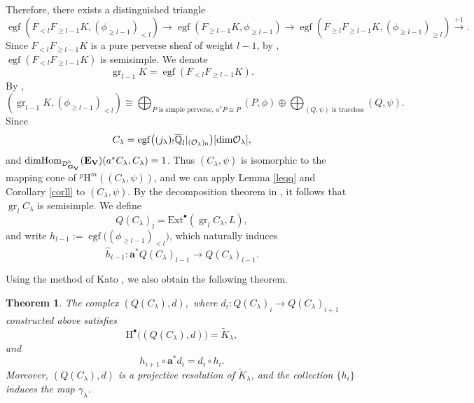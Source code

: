 \documentclass[10pt,a4paper]{amsart}
\newtheorem{theorem}{Theorem}[section]
\def\Hom{\mbox{\rm Hom}}  \def\ap{\mbox{\rm ap}}
\def\dim{\mbox{\rm dim}}   \def\End{\mbox{\rm End}}
\def\bfV{{\mathbf V}}
\def\bfV{\mathbf{V}}
\def\bfE{\mathbf{E}}
\def\bfG{\mathbf{G}}
\begin{document}
Therefore, there exists a distinguished triangle
\[
\operatorname{egf}(F_{<l} F_{\geq l-1} K, (\phi_{\geq l-1})_{<l}) \to \operatorname{egf}(F_{\geq l-1} K, \phi_{\geq l-1}) \to \operatorname{egf}(F_{\geq l} F_{\geq l-1} K, (\phi_{\geq l-1})_{\geq l}) \xrightarrow{+1}.
\]
Since $F_{<l} F_{\geq l-1} K$ is a pure perverse sheaf of weight $l-1$, by \cite[Theorem 5.4.5]{BBD}, $\operatorname{egf}(F_{<l} F_{\geq l-1} K)$ is semisimple. We denote
\[
\operatorname{gr}_{l-1} K = \operatorname{egf}(F_{<l} F_{\geq l-1} K).
\]
By \cite[11.1.3]{lusztig2010introduction},
\[
(\operatorname{gr}_{l-1} K ,(\phi_{\geq l-1})_{<l})\cong \bigoplus_{P\text{ is simple perverse, }a^*P\cong P}(P,\phi)\oplus \bigoplus_{(Q,\psi)\text{ is traceless}}(Q,\psi).
\]
Since
\[
C_{\lambda} = \operatorname{egf}\bigl((j_{\lambda})_! \overline{\mathbb{Q}}_l |_{(\mathcal{O}_{\lambda})_0}\bigr)[\dim \mathcal{O}_{\lambda}],
\]
and $\dim\Hom_{\cD^b_{\bfG_{\bfV}}}(\bfE_{\bfV})(a^*C_{\lambda},C_{\lambda})=1$. Thus $(C_{\lambda},\psi)$ is isomorphic to the mapping cone of ${}^p\mathrm{H}^m((C_{\lambda},\psi))$, and we can apply Lemma \ref{leqq} and Corollary \ref{corll} to $(C_{\lambda},\psi)$.
By the decomposition theorem in \cite{BBD}, it follows that $\operatorname{gr}_l C_{\lambda}$ is semisimple. We define
\[
Q(C_{\lambda})_l = \mathrm{Ext}^{\bullet}(\operatorname{gr}_l C_{\lambda}, L),
\]
and write $h_{l-1} := \operatorname{egf}\bigl((\phi_{\geq l-1})_{<l}\bigr)$, which naturally induces
\[
\hat{h}_{l-1} : \mathbf{a}^* Q(C_{\lambda})_{l-1} \to Q(C_{\lambda})_{l-1}.
\]

Using the method of Kato \cite{cd088214-009e-3813-9a86-97f9a299a24c}, we also obtain the following theorem.


\begin{theorem}
The complex $(Q(C_{\lambda}), d),$ where $d_i : Q(C_{\lambda})_i \to Q(C_{\lambda})_{i+1}$ constructed above satisfies
\[
\mathrm{H}^{\bullet}\bigl((Q(C_{\lambda}), d)\bigr) = \widetilde{K}_{\lambda},
\]
and
\[
h_{i+1} \circ \mathbf{a}^* d_i = d_i \circ h_i.
\]
Moreover, $(Q(C_{\lambda}), d)$ is a projective resolution of $\widetilde{K}_{\lambda}$, and the collection $\{h_i\}$ induces the map $\gamma_{\lambda}$.
\end{theorem}
\end{document}
